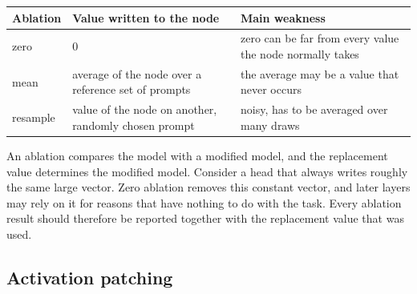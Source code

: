 \begin{center}\small
\begin{tabular}{@{}lp{}p{}@{}}
\toprule
Ablation & Value written to the node & Main weakness \\
\midrule
zero & $0$ & zero can be far from every value the node normally takes \\
mean & average of the node over a reference set of prompts & the average may be a value that never occurs \\
resample & value of the node on another, randomly chosen prompt & noisy, has to be averaged over many draws \\
\bottomrule
\end{tabular}
\end{center}

\begin{caution}
An ablation compares the model with a modified model, and the replacement value determines the modified model.
Consider a head that always writes roughly the same large vector. Zero ablation removes this constant vector, and
later layers may rely on it for reasons that have nothing to do with the task. Every ablation result should
therefore be reported together with the replacement value that was used.
\end{caution}

\subsection{Activation patching}
\label{sec:patching}

